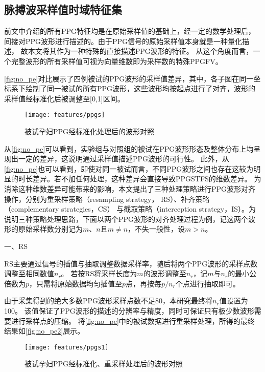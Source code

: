 \subsection{脉搏波采样值时域特征集}

前文中介绍的所有PPG特征均是在原始采样值的基础上，经一定的数学处理后，间接对PPG波形进行描述的。由于PPG信号的原始采样值本身就是一种量化描述，
故本文将其作为一种特殊的直接描述PPG波形的特征。
从这个角度而言，一个完整波形的所有采样值可视为向量维数即为采样数的特殊PPGFV。

\autoref{fig:no_pe}对比展示了四例被试的PPG波形的采样值差异，其中，各子图在同一坐标系下绘制了同一被试的所有PPG波形，这些波形均按起点进行了对齐，波形的采样值经标准化后被调整至[0,1]区间。

\begin{figure}[htbp]
  \centering
  \texttt{[image: features/ppgs]}
  \caption{\label{fig:no_pe}被试孕妇PPG经标准化处理后的波形对照}
\end{figure}

从\autoref{fig:no_pe}可以看到，实验组与对照组的被试在PPG波形形态及整体分布上均呈现出一定的差异，这说明通过采样值描述PPG波形的可行性。
此外，从\autoref{fig:no_pe}也可以看到，即使对同一被试而言，不同PPG波形之间也存在这较为明显的时长差异。若不加任何处理，这种差异会直接导致PPGSTFS的维数差异。
为消除这种维数差异可能带来的影响，本文提出了三种处理策略进行PPG波形对齐操作，分别为重采样策略（resampling strategy， RS）、补齐策略（complementary strategies，CS）
与截取策略（interception strategy，IS）。为说明三种策略处理思路，下面以两个PPG波形的对齐处理过程为例，记这两个波形的原始采样数分别记为$m$、$n$且$m \neq n$，不失一般性，设$m>n$。

一、RS

RS主要通过信号的插值与抽取调整数据采样率，随后将两个PPG波形的采样点数调整至相同数值$n_r$。
若按RS将采样长度为$m$的波形调整至$n_r$，记$m$与$n_r$的最小公倍数为$p$，只需将原始数据均匀插值至$p$点，再按每$p/n_r$个点进行抽取即可。

由于采集得到的绝大多数PPG波形采样点数不足80，本研究最终将$n_r$值设置为100。
该值保证了PPG波形的描述的分辨率与精度，同时可保证只有极少数波形需要进行采样点的压缩。
将\autoref{fig:no_pe}中的被试数据进行重采样处理，所得的最终结果如\autoref{fig:no_pe2}展示。

\begin{figure}[htbp]
  \centering
  \texttt{[image: features/ppgs1]}
  \caption{\label{fig:no_pe2}被试孕妇PPG经标准化、重采样处理后的波形对照}
\end{figure}

